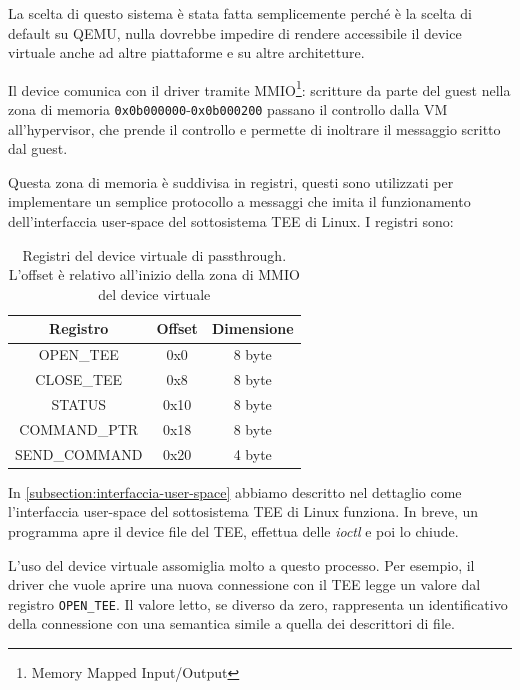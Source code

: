 \documentclass[12pt,italian]{report}
\begin{document}
La scelta di questo sistema è stata fatta semplicemente perché è
la scelta di default su QEMU, nulla dovrebbe impedire di rendere
accessibile il device virtuale anche ad altre piattaforme e su altre
architetture.

\bigbreak \noindent

Il device comunica con il driver tramite MMIO\footnote{
    Memory Mapped Input/Output
}:
scritture da parte del guest nella zona di memoria
\texttt{0x0b000000}-\texttt{0x0b000200}
passano il controllo dalla VM all'hypervisor, che prende il controllo e
permette di inoltrare il messaggio scritto dal guest.

Questa zona di memoria è suddivisa in registri, questi sono utilizzati
per implementare un semplice protocollo a messaggi che imita il funzionamento
dell'interfaccia user-space del sottosistema TEE di Linux.
I registri sono:

\begin{table}
    \centering
    \begin{tabular}{|c|c|c|}
        \hline
        \textbf{Registro}   & \textbf{Offset} & \textbf{Dimensione} \\
        \hline
        OPEN\_TEE           & 0x0             & 8 byte \\
        CLOSE\_TEE          & 0x8             & 8 byte \\
        STATUS              & 0x10            & 8 byte \\
        COMMAND\_PTR        & 0x18            & 8 byte \\
        SEND\_COMMAND       & 0x20            & 4 byte \\
        \hline
    \end{tabular}
    \caption{
        Registri del device virtuale di passthrough.
        L'offset è relativo all'inizio della zona di MMIO del device virtuale
    }
    \label{table:registri-device}
\end{table}

In \ref{subsection:interfaccia-user-space} abbiamo descritto nel dettaglio
come l'interfaccia user-space del sottosistema TEE di Linux funziona.
In breve, un programma apre il device file del TEE, effettua delle
\textit{ioctl} e poi lo chiude.

L'uso del device virtuale assomiglia molto a questo processo.
Per esempio, il driver che vuole aprire una nuova connessione con il TEE
legge un valore dal registro \texttt{OPEN\_TEE}.
Il valore letto, se diverso da zero, rappresenta un identificativo
della connessione con una semantica simile a quella dei descrittori
di file.
\end{document}
